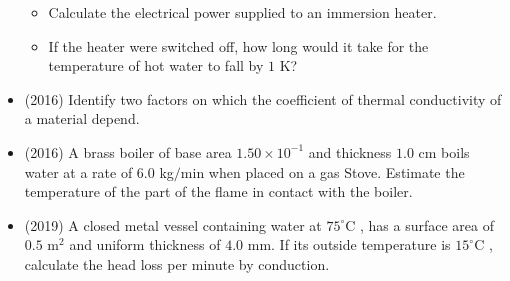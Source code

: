 \documentclass{article}
\begin{document}
\begin{itemize}
 \begin{itemize}
\item Calculate the electrical power supplied to an immersion heater.
\item If the heater were switched off, how long would it take for the temperature of hot water to fall by $ 1$ K?
\end{itemize}
\item (2016)  Identify two factors on which the coefficient of thermal conductivity of a material depend.
\item (2016)  A brass boiler of base area $ 1.50\times 10^{-1}$ and thickness $ 1.0$ cm boils water at a rate of $ 6.0$ kg$/$min when placed on a gas Stove. Estimate the temperature of the part of the flame in contact with the boiler.
\item (2019)  A closed metal vessel containing water at $ 75^{\circ}$C , has a surface area of $ 0.5$ m$ ^{2}$ and uniform thickness of $ 4.0$ mm.  If its outside temperature is $ 15^{\circ}$C , calculate the head loss per minute by conduction.
\end{itemize}
\end{document}
